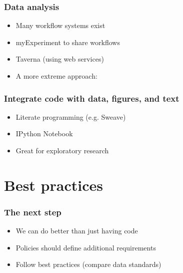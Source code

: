 \documentclass[slidestop]{beamer}
\begin{document}
\begin{frame}
  \frametitle{Data analysis}
  \begin{itemize}
    \item<1-> Many workflow systems exist
    \item<2-> myExperiment to share workflows
    \item<3-> Taverna (using web services)
    \item<4-> A more extreme approach:
  \end{itemize}

\end{frame}

\begin{frame}
  \frametitle{Integrate code with data, figures, and text}
  \begin{itemize}[<+->]
    \item Literate programming (e.g. Sweave)
    \item IPython Notebook
    \item Great for exploratory research
  \end{itemize}
\end{frame}


\section*{}


\section{Best practices}

\begin{frame}
  \frametitle{The next step}
  \begin{itemize}
    \item We can do better than just having code
    \item Policies should define additional requirements
    \item Follow best practices (compare data standards)
  \end{itemize}
\end{frame}
\end{document}

